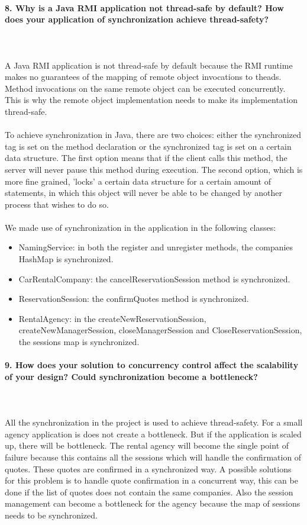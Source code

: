 \documentclass{ds-report}
\begin{document}
	\paragraph{8. Why is a Java RMI application not thread-safe by default? How does your application of synchronization achieve thread-safety?} \mbox{}\\\\
A Java RMI application is not thread-safe by default because the RMI runtime makes no guarantees of the mapping of remote object invocations to theads. Method invocations on the same remote object can be executed concurrently. This is why the remote object implementation needs to make its implementation thread-safe.\\\\
To achieve synchronization in Java, there are two choices: either the synchronized tag is set on the method declaration or the synchronized tag is set on a certain data structure. The first option means that if the client calls this method, the server will never pause this method during execution. The second option, which is more fine grained, 'locks' a certain data structure for a certain amount of statements, in which this object will never be able to be changed by another process that wishes to do so.\\\\
We made use of synchronization in the application in the following classes:
\begin{itemize}
	\item NamingService: in both the register and unregister methods, the companies HashMap is synchronized. 
	\item CarRentalCompany: the cancelReservationSession method is synchronized.
	\item ReservationSession: the confirmQuotes method is synchronized.
	\item RentalAgency: in the createNewReservationSession, createNewManagerSession, closeManagerSession and CloseReservationSession, the sessions map is synchronized.
\end{itemize} 


	\paragraph{9. How does your solution to concurrency control affect the scalability of your design? Could synchronization become a bottleneck?} \mbox{}\\\\
All the synchronization in the project is used to achieve thread-safety. For a small agency application is does not create a bottleneck. But if the application is scaled up, there will be bottleneck. The rental agency will become the single point of failure because this contains all the sessions which will handle the confirmation of quotes. These quotes are confirmed in a synchronized way. A possible solutions for this problem is to handle quote confirmation in a concurrent way, this can be done if the list of quotes does not contain the same companies. Also the session management can become a bottleneck for the agency because the map of sessions needs to be synchronized.
\end{document}
